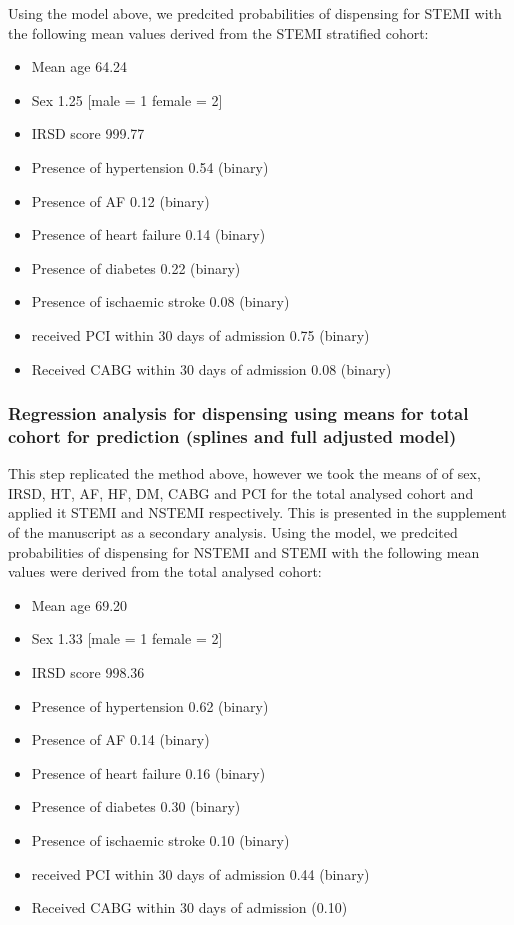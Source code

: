 \documentclass[11pt]{article}
\begin{document}
Using the model above, we predcited probabilities of dispensing for STEMI with the following mean values derived from the STEMI stratified cohort: \\
\begin{itemize}
\item Mean age 64.24
\item Sex 1.25 [male = 1 female = 2]
\item IRSD score 999.77
\item Presence of hypertension 0.54 (binary)
\item Presence of AF 0.12 (binary)
\item Presence of heart failure 0.14 (binary)
\item Presence of diabetes 0.22 (binary)
\item Presence of ischaemic stroke 0.08 (binary)
\item received PCI within 30 days of admission 0.75 (binary)
\item Received CABG within 30 days of admission 0.08 (binary)
\end{itemize}
\color{violet}
\begin{stlog}\end{stlog}
\color{black}
\subsubsection{Regression analysis for dispensing using means for total cohort for prediction (splines and full adjusted model)}
This step replicated the method above, however we took the means of of sex, IRSD, HT, AF, HF, DM, CABG and PCI for the total analysed cohort and applied it STEMI and NSTEMI respectively. This is presented in the supplement of the manuscript as a secondary analysis. 
Using the model, we predcited probabilities of dispensing for NSTEMI and STEMI with the following mean values were derived from the total analysed cohort: \\
\begin{itemize}
\item Mean age 69.20
\item Sex 1.33 [male = 1 female = 2]
\item IRSD score 998.36
\item Presence of hypertension 0.62 (binary)
\item Presence of AF 0.14 (binary)
\item Presence of heart failure 0.16 (binary)
\item Presence of diabetes 0.30 (binary)
\item Presence of ischaemic stroke 0.10 (binary)
\item received PCI within 30 days of admission 0.44 (binary)
\item Received CABG within 30 days of admission (0.10)
\end{itemize}
\color{violet}
\begin{stlog}\end{stlog}
\color{black}
\end{document}
